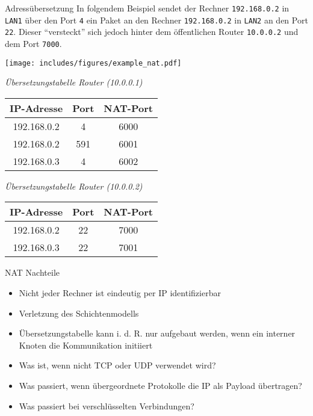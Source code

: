 \begin{example}{Adressübersetzung}
    In folgendem Beispiel sendet der Rechner \texttt{192.168.0.2} in \texttt{LAN1} über den Port \texttt{4} ein Paket an den Rechner \texttt{192.168.0.2} in \texttt{LAN2} an den Port \texttt{22}.
    Dieser \enquote{versteckt} sich jedoch hinter dem öffentlichen Router \texttt{10.0.0.2} und dem Port \texttt{7000}.

    \texttt{[image: includes/figures/example\_nat.pdf]}

    \begin{minipage}[t]{0.5\textwidth}
        \begin{center}
            \emph{Übersetzungstabelle Router (10.0.0.1)}

            \begin{tabular}{|c|c||c|}
                \hline
                IP-Adresse  & Port & NAT-Port \\\hline\hline
                192.168.0.2 & 4    & 6000     \\\hline
                192.168.0.2 & 591  & 6001     \\\hline
                192.168.0.3 & 4    & 6002     \\\hline
            \end{tabular}
        \end{center}
    \end{minipage}
    \begin{minipage}[t]{0.5\textwidth}
        \begin{center}
            \emph{Übersetzungstabelle Router (10.0.0.2)}

            \begin{tabular}{|c|c||c|}
                \hline
                IP-Adresse  & Port & NAT-Port \\\hline\hline
                192.168.0.2 & 22   & 7000     \\\hline
                192.168.0.3 & 22   & 7001     \\\hline
            \end{tabular}
        \end{center}
    \end{minipage}
\end{example}

\begin{bonus}{NAT Nachteile}
    \begin{itemize}
        \item Nicht jeder Rechner ist eindeutig per IP identifizierbar
        \item Verletzung des Schichtenmodells
        \item Übersetzungstabelle kann i. d. R. nur aufgebaut werden, wenn ein interner Knoten die Kommunikation initiiert
        \item Was ist, wenn nicht TCP oder UDP verwendet wird?
        \item Was passiert, wenn übergeordnete Protokolle die IP als Payload übertragen?
        \item Was passiert bei verschlüsselten Verbindungen?
    \end{itemize}
\end{bonus}

